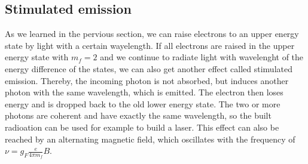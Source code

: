 \subsection{Stimulated emission}
As we learned in the pervious section, we can raise electrons to an upper energy state by light with a certain wayelength. If all electrons are raised in the upper energy state with $m_f=2$ and we continue to radiate light with wavelenght of the energy difference of the states, we can also get another effect called stimulated emission. Thereby, the incoming photon is not absorbed, but induces another photon with the same wavelength, which is emitted. The electron then loses energy and is dropped back to the old lower energy state. The two or more photons are coherent and have exactly the same wavelength, so the built radioation can be used for example to build a laser. This effect can also be reached by an alternating magnetic field, which oscillates with the frequency of $\nu=g_F \frac{e}{4\pi m_f}B$.





